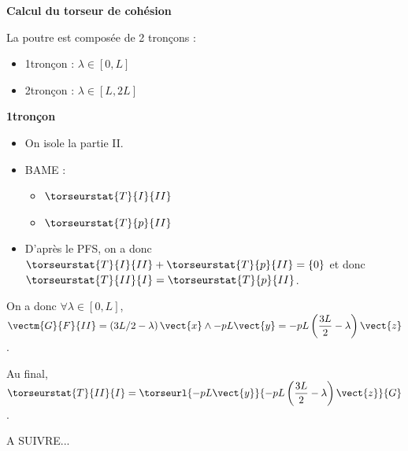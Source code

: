 \begin{corrigebox}
\textbf{Calcul du torseur de cohésion}

La poutre est composée de 2 tronçons :
\begin{itemize}
\item 1\ier tronçon : $\lambda\in[0,L]$
\item 2\ieme tronçon : $\lambda\in[L,2L]$
\end{itemize}

\textbf{1\ier tronçon}
\begin{itemize}
\item On isole la partie II.
\item BAME : 
\begin{itemize}
\item $\torseurstat{T}{I}{II}$
\item $\torseurstat{T}{p}{II}$
\end{itemize}
\item D'après le PFS, on a donc $\torseurstat{T}{I}{II} + \torseurstat{T}{p}{II} = \{0\}$ et donc 
$\torseurstat{T}{II}{I} =  \torseurstat{T}{p}{II}$.
\end{itemize}
On a donc $\forall \lambda\in[0,L]$, $\vectm{G}{F}{II}=  \left(3L/2-\lambda\right)\vect{x} \wedge - pL\vect{y} =- pL \left(\dfrac{3L}{2}-\lambda\right) \vect{z} $. 

Au final, $\torseurstat{T}{II}{I} = \torseurl{-pL\vect{y}}{- pL \left(\dfrac{3L}{2}-\lambda\right) \vect{z}}{G}$.

A SUIVRE...
\par\medskip\begin{center}\captionsetup{type=figure}
\centering

\end{center}\par\medskip
\end{corrigebox}
